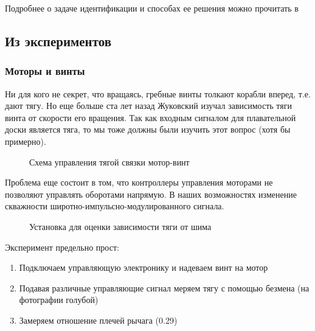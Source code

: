 \documentclass[12pt,a4paper]{article}
\begin{document}
Подробнее о задаче идентификации и способах ее решения можно прочитать в \cite{ljung_identification}


\subsection{Из экспериментов}


\subsubsection{Моторы и винты}

Ни для кого не секрет, что вращаясь, гребные винты толкают корабли вперед, т.е. дают тягу. Но еще больше ста лет назад Жуковский изучал зависимость тяги винта от скорости его вращения. Так как входным сигналом для плавательной доски является тяга, то мы тоже должны были изучить этот вопрос (хотя бы примерно). 

\begin{figure}[h]
	\caption{Схема управления тягой связки мотор-винт}
\end{figure}

Проблема еще состоит в том, что контроллеры управления моторами не позволяют управлять оборотами напрямую. В наших возможностях изменение скважности широтно-импульсно-модулированного сигнала. 

\begin{figure}[h]
	\caption{Установка для оценки зависимости тяги от шима}
\end{figure}

Эксперимент предельно прост:

\begin{enumerate}
	\item Подключаем управляющую электронику и надеваем винт на мотор
	\item Подавая различные управляющие сигнал меряем тягу с помощью безмена (на фотографии голубой)
	\item Замеряем отношение плечей рычага (0.29)
\end{enumerate}
\end{document}

